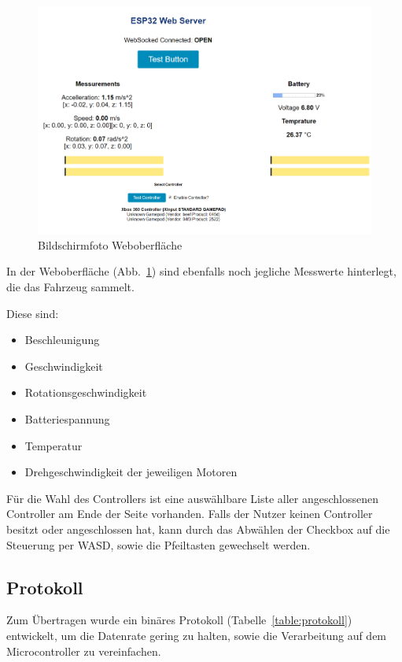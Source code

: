 \begin{figure}[!ht]
	\centering
	\includegraphics[width=\textwidth]{bilder/WebValues.png}
	\caption{Bildschirmfoto Weboberfläche}
	\label{bild:webvalues}
\end{figure}

In der Weboberfläche (Abb.~\ref{bild:webvalues}) sind ebenfalls noch jegliche Messwerte hinterlegt, die das Fahrzeug sammelt.\par

Diese sind:\par

\begin{itemize}
	\item Beschleunigung 
	\item Geschwindigkeit
	\item Rotationsgeschwindigkeit
	\item Batteriespannung
	\item Temperatur
	\item Drehgeschwindigkeit der jeweiligen Motoren
\end{itemize}\par


\vspace{\baselineskip}
Für die Wahl des Controllers ist eine auswählbare Liste aller angeschlossenen Controller am Ende der Seite vorhanden. Falls der Nutzer keinen Controller besitzt oder angeschlossen hat, kann durch das Abwählen der Checkbox auf die Steuerung per WASD, sowie die Pfeiltasten gewechselt werden.\par

\subsection{Protokoll}
Zum Übertragen wurde ein binäres Protokoll (Tabelle~\ref{table:protokoll}) entwickelt, um die Datenrate gering zu halten, sowie die Verarbeitung auf dem Microcontroller zu vereinfachen.\par

